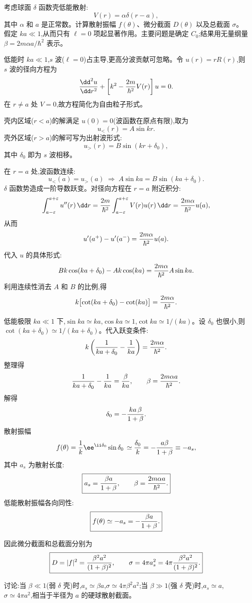 \begin{question}
考虑球面 $\delta$ 函数壳低能散射:
\[
V(r)=\alpha\delta(r-a),
\]
其中 $\alpha$ 和 $a$ 是正常数。计算散射振幅 $f(\theta)$、微分截面 $D(\theta)$ 以及总截面 $\sigma$。假定 $ka\ll 1$,从而只有 $\ell=0$ 项起显著作用。主要问题是确定 $C_0$;结果用无量纲量 $\beta=2m\alpha a/\hbar^2$ 表示。
\begin{solution}
低能时 $ka\ll1$,$s$ 波($\ell=0$)占主导,更高分波贡献可忽略。令 $u(r)=rR(r)$,则 $s$ 波的径向方程为
\[
{\dd^2u\over\dd r^2}+\left[k^2-{2m\over\hbar^2}V(r)\right]u=0.
\]
在 $r\neq a$ 处 $V=0$,故方程简化为自由粒子形式。

壳内区域($r<a$)的解满足 $u(0)=0$(波函数在原点有限),取为
\[
u_{<}(r)=A\sin kr.
\]
壳外区域($r>a$)的解可写为出射波形式:
\[
u_{>}(r)=B\sin(kr+\delta_0),
\]
其中 $\delta_0$ 即为 $s$ 波相移。

在 $r=a$ 处,波函数连续:
\[
u_{<}(a)=u_{>}(a)\;\Longrightarrow\;A\sin ka=B\sin(ka+\delta_0).
\]
$\delta$ 函数势造成一阶导数跃变。对径向方程在 $r=a$ 附近积分:
\[
\int_{a-\varepsilon}^{a+\varepsilon}u''(r)\,\dd r
={2m\over\hbar^2}\int_{a-\varepsilon}^{a+\varepsilon}V(r)u(r)\,\dd r
={2m\alpha\over\hbar^2}u(a),
\]
从而
\[
u'(a^+)-u'(a^-)={2m\alpha\over\hbar^2}u(a).
\]
代入 $u$ 的具体形式:
\[
Bk\cos(ka+\delta_0)-Ak\cos(ka)={2m\alpha\over\hbar^2}A\sin ka.
\]
利用连续性消去 $A$ 和 $B$ 的比例,得
\[
k\bigl[\cot(ka+\delta_0)-\cot(ka)\bigr]={2m\alpha\over\hbar^2}.
\]

低能极限 $ka\ll1$ 下,$\sin ka\simeq ka$,$\cos ka\simeq1$,$\cot ka\simeq 1/(ka)$。设 $\delta_0$ 也很小,则 $\cot(ka+\delta_0)\simeq 1/(ka+\delta_0)$。代入跃变条件:
\[
k\left({1\over ka+\delta_0}-{1\over ka}\right)={2m\alpha\over\hbar^2}.
\]
整理得
\[
{1\over ka+\delta_0}-{1\over ka}={\beta\over ka},\qquad\beta={2m\alpha a\over\hbar^2}.
\]
解得
\[
\delta_0=-{ka\,\beta\over1+\beta}.
\]
散射振幅
\[
f(\theta)={1\over k}\ee^{\ii\delta_0}\sin\delta_0\,
\simeq{\delta_0\over k}
=-{a\beta\over1+\beta}\equiv -a_s,
\]
其中 $a_s$ 为散射长度:
\[
\boxed{a_s={\beta a\over1+\beta},\qquad\beta={2m\alpha a\over\hbar^2}.}
\]
低能散射振幅各向同性:
\[
\boxed{f(\theta)\simeq -a_s=-{\beta a\over1+\beta}.}
\]

因此微分截面和总截面分别为
\[
\boxed{D=|f|^2={\beta^2a^2\over(1+\beta)^2},
\qquad
\sigma=4\pi a_s^2=4\pi{\beta^2a^2\over(1+\beta)^2}.}
\]

讨论:当 $\beta\ll1$(弱 $\delta$ 壳)时,$a_s\simeq\beta a$,$\sigma\simeq 4\pi\beta^2a^2$;当 $\beta\gg1$(强 $\delta$ 壳)时,$a_s\simeq a$,$\sigma\simeq 4\pi a^2$,相当于半径为 $a$ 的硬球散射截面。
\end{solution}
\end{question}


